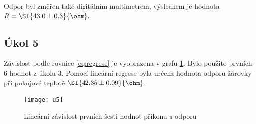 \documentclass[0-protokol.tex]{subfiles}
\begin{document}
Odpor byl změřen také digitálním multimetrem, výsledkem je hodnota $R = \SI{43.0 \pm 0.3}{\ohm}.$

\newpage

\subsection*{Úkol 5}
Závislost podle rovnice \eqref{eq:regrese} je vyobrazena v grafu \ref{fig:u5}. Bylo použito prvních 6 hodnot z úkolu 3. Pomocí lineární regrese byla určena hodnota odporu žárovky při pokojové teplotě $\SI{42.35 \pm 0.09}{\ohm}$.

\begin{figure}[H]
\centering
\texttt{[image: u5]}
\caption{Lineární závislost prvních šesti hodnot příkonu a odporu}
\label{fig:u5}
\end{figure}
\end{document}
